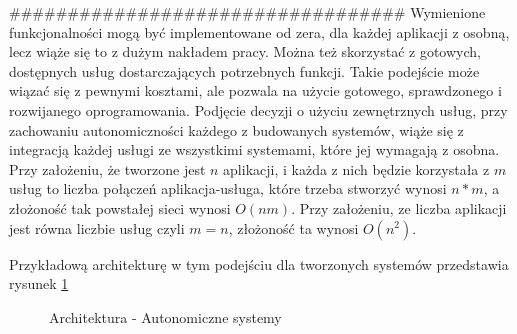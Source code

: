 ##################################
Wymienione funkcjonalności mogą być implementowane od zera, dla każdej aplikacji z osobną, lecz wiąże się to z dużym nakładem pracy. Można też skorzystać z gotowych, dostępnych usług dostarczających potrzebnych funkcji. Takie podejście może wiązać się z pewnymi kosztami, ale pozwala na użycie gotowego, sprawdzonego i rozwijanego oprogramowania. Podjęcie decyzji o użyciu zewnętrznych usług, przy zachowaniu autonomiczności każdego z budowanych systemów, wiąże się z integracją każdej usługi ze wszystkimi systemami, które jej wymagają z osobna. Przy założeniu, że tworzone jest \begin{math}n\end{math} aplikacji, i każda z nich będzie korzystała z \begin{math}m\end{math} usług to liczba połączeń aplikacja-usługa, które trzeba stworzyć wynosi  \begin{math}n*m\end{math}, a złożoność tak powstałej sieci wynosi \begin{math}O(nm)\end{math}. Przy założeniu, ze liczba aplikacji jest równa liczbie usług czyli \begin{math}m = n\end{math}, złożoność ta wynosi \begin{math}O(n^2)\end{math}.

 Przykładową architekturę w tym podejściu dla tworzonych systemów przedstawia rysunek \ref{fig:autonomiczne_systemy}

\setlength\fboxsep{20pt}
\setlength\fboxrule{1pt}
\begin{figure}[!h]
	\centering
	\caption{Architektura - Autonomiczne systemy}\label{fig:autonomiczne_systemy}
\end{figure}

